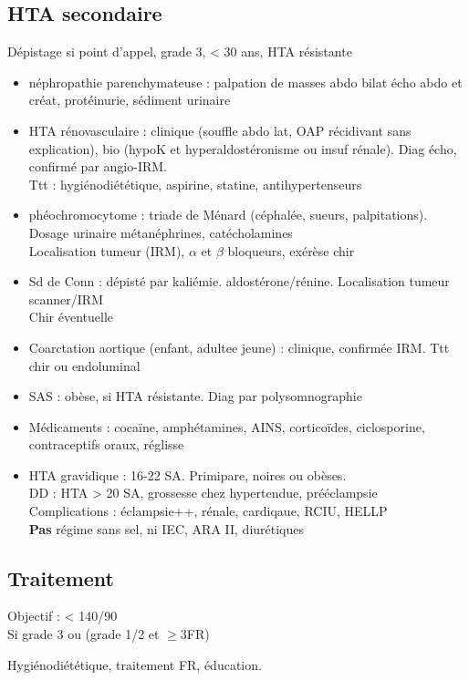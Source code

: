 \documentclass{article}
\begin{document}
\subsection{HTA secondaire}
Dépistage si point d'appel, grade 3, < 30 ans, HTA résistante

\begin{itemize}
  \item néphropathie parenchymateuse : palpation de masses abdo bilat \thus écho
    abdo et créat, protéinurie, sédiment urinaire
  \item HTA rénovasculaire : clinique (souffle abdo lat, OAP récidivant sans
    explication), bio (hypoK et hyperaldostéronisme ou insuf rénale). Diag
    écho, confirmé par angio-IRM. \\
    Ttt : hygiénodiététique, aspirine, statine, antihypertenseurs
  \item phéochromocytome : triade de Ménard (céphalée, sueurs, palpitations).
    Dosage urinaire métanéphrines, catécholamines\\
    Localisation tumeur (IRM), $\alpha$ et $\beta$ bloqueurs, exérèse chir
  \item Sd de Conn : dépisté par kaliémie. \inc aldostérone/rénine. Localisation
    tumeur scanner/IRM\\
    Chir éventuelle
  \item Coarctation aortique (enfant, adultee jeune) : clinique, confirmée IRM.
    Ttt chir ou endoluminal
  \item SAS : obèse, si HTA résistante. Diag par polysomnographie
  \item Médicaments : cocaïne, amphétamines, AINS, corticoïdes, ciclosporine,
    contraceptifs oraux, réglisse
  \item HTA gravidique : 16-22 SA. Primipare, noires ou obèses.\\
    DD : HTA > 20 SA, grossesse chez hypertendue, prééclampsie\\
    Complications : éclampsie++, rénale, cardiqaue, RCIU, HELLP\\
    \textbf{Pas} régime sans sel, ni IEC, ARA II, diurétiques
\end{itemize}

\subsection{Traitement}
Objectif : < 140/90\\
Si grade 3 ou (grade 1/2 et $\ge 3$FR)

Hygiénodiététique, traitement FR, éducation.
\end{document}
